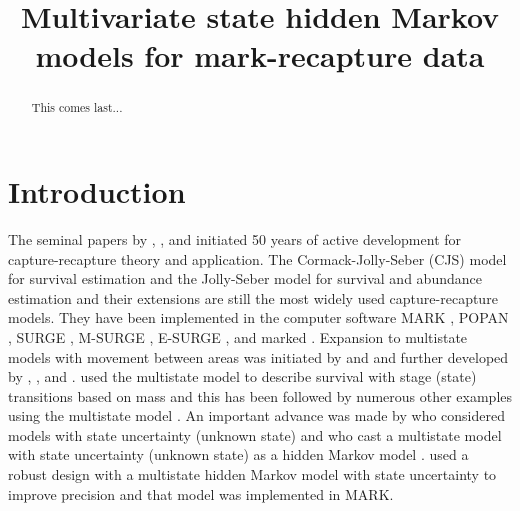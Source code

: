 \documentclass[sts]{imsart}
\numberwithin{equation}{section}
\theoremstyle{plain}
\begin{document}
\begin{frontmatter}
\title{Multivariate state hidden Markov models for mark-recapture data}


\begin{abstract}
This comes last...

\end{abstract}


\begin{keyword}
\end{keyword}

\end{frontmatter}




\section{Introduction}
The seminal papers by \cite{Cormack1964}, \cite{Jolly1965}, and \cite{Seber1965} initiated 50 years of active development for capture-recapture theory and application.  The Cormack-Jolly-Seber (CJS) model for survival estimation and the Jolly-Seber model for survival and abundance estimation and their extensions are still the most widely used capture-recapture models. They have been implemented in the computer software MARK \citep{White1999}, POPAN \citep{Arnason1999}, SURGE \citep{Lebreton1992}, M-SURGE \citep{Choquet2004}, E-SURGE \citep{choquet2009}, and marked \citep{Laake2013MEE}. Expansion to multistate models with movement between areas was initiated by \cite{darroch1958multiple} and \cite{arnason1973} and further developed by \cite{hilborn1990}, \cite{Hestbeck1991}, \cite{Schwarz1993} and \cite{Brownie1993}.  \cite{Nichols1992} used the multistate model to describe survival with stage (state) transitions based on mass and this has been followed by numerous other examples using the multistate model \citep{Lebreton2002,Nicholsandkendall1995,White2006}. An important advance was made by \cite{Kendall2004b} who considered models with state uncertainty (unknown state) and \cite{Pradel2005} who cast a multistate model with state uncertainty (unknown state) as a hidden Markov model \citep{zucchini2009hidden}. \cite{kendall2012estimating} used a robust design with a multistate hidden Markov model with state uncertainty to improve precision and that model was implemented in MARK.
\end{document}
